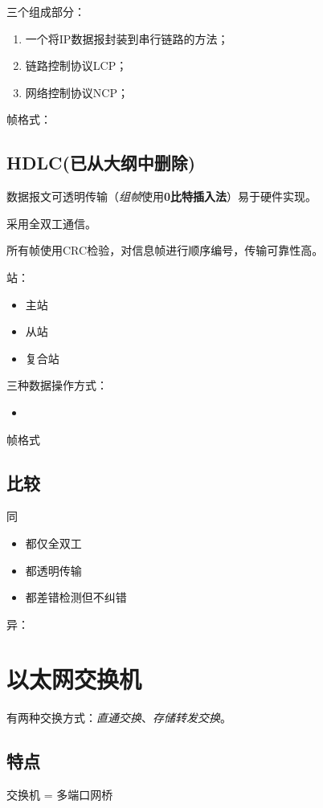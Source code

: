 三个组成部分：\begin{enumerate}
    \item 一个将IP数据报封装到串行链路的方法；
    \item 链路控制协议LCP；
    \item 网络控制协议NCP；
\end{enumerate}

帧格式：


\subsection{HDLC(已从大纲中删除)}
数据报文可透明传输（\textit{组帧}使用\textbf{0比特插入法}）易于硬件实现。

采用全双工通信。

所有帧使用CRC检验，对信息帧进行顺序编号，传输可靠性高。

站：\begin{itemize}
    \item 主站
    \item 从站
    \item 复合站
\end{itemize}

三种数据操作方式：\begin{itemize}
    \item 
\end{itemize}

帧格式


\subsection{比较}
同\begin{itemize}
    \item 都仅全双工
    \item 都透明传输
    \item 都差错检测但不纠错
\end{itemize}

异：


\section{以太网交换机}

有两种交换方式：\textit{直通交换}、\textit{存储转发交换}。

\subsection{特点}
交换机 = 多端口网桥

